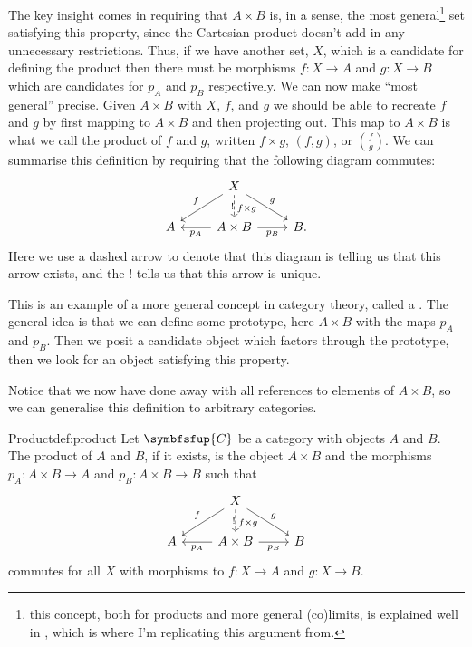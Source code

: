 \documentclass[fleqn]{NotesClass}
\newcommand{\cat}[1]{\symbfsfup{#1}}
\begin{document}
    The key insight comes in requiring that \(A \times B\) is, in a sense, the most general\footnote{this concept, both for products and more general (co)limits, is explained well in \cite{milewski}, which is where I'm replicating this argument from.} set satisfying this property, since the Cartesian product doesn't add in any unnecessary restrictions.
    Thus, if we have another set, \(X\), which is a candidate for defining the product then there must be morphisms \(f \colon X \to A\) and \(g \colon X \to B\) which are candidates for \(p_A\) and \(p_B\) respectively.
    We can now make \enquote{most general} precise.
    Given \(A \times B\) with \(X\), \(f\), and \(g\) we should be able to recreate \(f\) and \(g\) by first mapping to \(A \times B\) and then projecting out.
    This map to \(A \times B\) is what we call the product of \(f\) and \(g\), written \(f \times g\), \((f, g)\), or \(\binom{f}{g}\).
    We can summarise this definition by requiring that the following diagram commutes:
    \begin{equation}
        \begin{tikzcd}
            & X \arrow[d, "f \times g"{pos=0.6}, dashed, "!"'{xshift=0.075cm}] \arrow[dl, "f"'] \arrow[dr, "g"] & \\
            A & A \times B \arrow[l, "p_A"] \arrow[r, "p_B"'] & B.
        \end{tikzcd}
    \end{equation}
    Here we use a dashed arrow to denote that this diagram is telling us that this arrow exists, and the \(!\) tells us that this arrow is unique.
    
    This is an example of a more general concept in category theory, called a .
    The general idea is that we can define some prototype, here \(A \times B\) with the maps \(p_A\) and \(p_B\).
    Then we posit a candidate object which factors through the prototype, then we look for an object satisfying this property.
    
    Notice that we now have done away with all references to elements of \(A \times B\), so we can generalise this definition to arbitrary categories.
    
    \begin{dfn}{Product}{def:product}
        Let \(\cat{C}\) be a category with objects \(A\) and \(B\).
        The product of \(A\) and \(B\), if it exists, is the object \(A \times B\) and the morphisms \(p_A \colon A \times B \to A\) and \(p_B \colon A \times B \to B\) such that
        \begin{equation}
            \begin{tikzcd}
                & X \arrow[d, "f \times g"{pos=0.6}, dashed, "!"'{xshift=0.075cm}] \arrow[dl, "f"'] \arrow[dr, "g"] & \\
                A & A \times B \arrow[l, "p_A"] \arrow[r, "p_B"'] & B
            \end{tikzcd}
        \end{equation}
        commutes for all \(X\) with morphisms to \(f \colon X \to A\) and \(g \colon X \to B\).
    \end{dfn}
    
\end{document}
